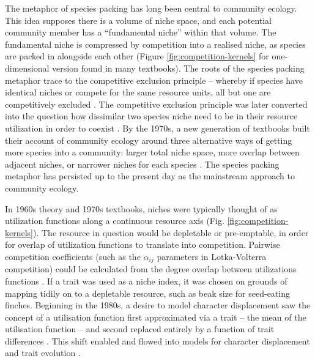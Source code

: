 \documentclass[a4paper,11pt]{article}
\begin{document}
The metaphor of species packing has long been central to community
ecology.  This idea supposes there is a volume of niche space, and
each potential community member has a ``fundamental niche'' within
that volume.  The fundamental niche is compressed by competition into
a realised niche, as species are packed in alongside each other
(Figure \ref{fig:competition-kernels} for one-dimensional version
found in many textbooks).
%
The roots of the species packing metaphor trace to the competitive
exclusion principle -- whereby if species have identical niches or
compete for the same resource units, all but one are
competitively excluded \citep{Lotka-1925, Volterra-1926, Gause-1934}.
The competitive exclusion principle was later converted into the
question how dissimilar two species niche need to be in their resource
utilization in order to coexist
\citep{MacArthur-1967, May-1972, Slatkin-1980}.
%
By the 1970s, a new generation of textbooks built their account of
community ecology around three alternative ways of getting more
species into a community: larger total niche space, more overlap
between adjacent niches, or narrower niches for each species
\citep{Whittaker-1970,Krebs-1972,Ricklefs-1973,Pianka-1974}. The
species packing metaphor has persisted up to the present day as the
mainstream approach to community ecology.

In 1960s theory and 1970s textbooks, niches were typically thought of
as utilization functions along a continuous resource axis
\citep{MacArthur-1967,Abrams-1975} (Fig. \ref{fig:competition-kernels}).
The resource in question would be depletable or pre-emptable, in order for
overlap of utilization functions to translate into
competition. Pairwise competition coefficients (such as the
$\alpha_{ij}$ parameters in Lotka-Volterra competition) could be
calculated from the degree overlap between utilizations functions
\citep{MacArthur-1967, May-1972, Abrams-1975}.
If a trait was used as a niche index, it was chosen on grounds of
mapping tidily on to a depletable resource, such as beak size for
seed-eating finches.
Beginning in the 1980s, a desire to model
character displacement saw the concept of a utilisation function first
approximated via a trait -- the mean of the utilisation function %
\citep{Roughgarden-1979} -- and second replaced entirely by a function
of trait differences \citep{Slatkin-1980,Taper-1985}. This shift enabled
and flowed into models for character displacement
\citep[e.g.,][]{Taper-1985, Case-2000, Goldberg-2006} and trait
evolution \citep{Brown-1987,Geritz-1998,Geritz-1999,Dieckmann-1999,
  Abrams-2001}.
\end{document}
